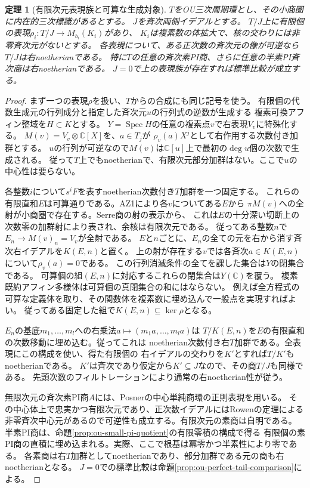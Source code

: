 \documentclass[11pt,a4paper]{ltjsarticle}
\newtheorem{theorem}{定理}[section]
\theoremstyle{definition}
\begin{document}
\begin{theorem}[有限次元表現族と可算な生成対象]
\label{thm:ou-small-countable-representations}
$T$をOU三次周期環とし、その小商圏に内在的三次標識があるとする。
$J$を斉次両側イデアルとする。
$T/J$上に有限個の表現$\rho_i:T/J\to M_{b_i}(K_i)$があり、
$K_i$は複素数の体拡大で、核の交わりには非零斉次元がないとする。
各表現について、ある正次数の斉次元の像が可逆なら$T/J$は右noetherianである。
特に$T$の任意の斉次素PI商、さらに任意の半素PI斉次商は右noetherianである。
$J=0$で上の表現族が存在すれば標準比較が成立する。
\end{theorem}
\begin{proof}
まず一つの表現$\rho$を扱い、$T$からの合成にも同じ記号を使う。
有限個の代数生成元の行列成分と指定した斉次元$u$の行列式の逆数が生成する
複素可換アフィン整域を$H\subset K$とする。
$Y=\operatorname{Spec}H$の任意の複素点$v$で右表現$V_v$に特殊化する。
$M(v)=V_v\otimes\mathbb C[X]$を、$a\in T_j$が
$\rho_v(a)X^j$として右作用する次数付き加群とする。
$u$の行列が可逆なので$M(v)$は$\mathbb C[u]$上で最初の$\deg u$個の次数で生成される。
従って$T$上でもnoetherianで、有限次元部分加群はない。ここで$u$の中心性は要らない。

各整数$i$について$s^iF$を表すnoetherian次数付き$T$加群を一つ固定する。
これらの有限直和$E$は可算通りである。AZ1により各$v$についてある$E$から
$\pi M(v)$への全射が小商圏で存在する。Serre商の射の表示から、
これは$E$の十分深い切断上の次数零の加群射により表され、余核は有限次元である。
従ってある整数$n$で$E_n\to M(v)_n=V_v$が全射である。
$E$と$n$ごとに、$E_n$の全ての元を右から消す斉次右イデアルを$K(E,n)$と置く。
上の射が存在する$v$では各斉次$a\in K(E,n)$について$\rho_v(a)=0$である。
この行列消滅条件の全てを課した集合は$Y$の閉集合である。
可算個の組$(E,n)$に対応するこれらの閉集合は$Y(\mathbb C)$を覆う。
複素既約アフィン多様体は可算個の真閉集合の和にはならない。
例えば全方程式の可算な定義体を取り、その関数体を複素数に埋め込んで一般点を実現すればよい。
従ってある固定した組で$K(E,n)\subseteq\ker\rho$となる。

$E_n$の基底$m_1,\ldots,m_l$への右乗法$a\mapsto(m_1a,\ldots,m_la)$は
$T/K(E,n)$を$E$の有限直和の次数移動に埋め込む。従ってこれは
noetherian次数付き右$T$加群である。全表現にこの構成を使い、得た有限個の
右イデアルの交わりを$K'$とすれば$T/K'$もnoetherianである。
$K'$は斉次であり仮定から$K'\subseteq J$なので、その商$T/J$も同様である。
先頭次数のフィルトレーションにより通常の右noetherian性が従う。

無限次元の斉次素PI商$A$には、Posnerの中心単純商環の正則表現を用いる。
その中心体上で忠実かつ有限次元であり、正次数イデアルにはRowenの定理による
非零斉次中心元があるので可逆性も成立する。有限次元の素商は自明である。
半素PI商は、命題\ref{prop:ou-small-pi-quotient}の有限零積の構成で得る
有限個の素PI商の直積に埋め込まれる。実際、ここで根基は冪零かつ半素性により零である。
各素商は右$T$加群としてnoetherianであり、部分加群である元の商も右noetherianとなる。
$J=0$での標準比較は命題\ref{prop:ou-perfect-tail-comparison}による。
\end{proof}
\end{document}
